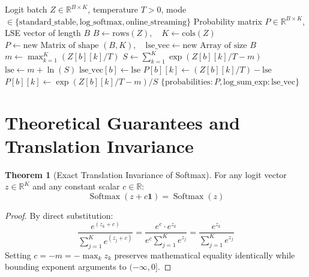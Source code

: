 \documentclass[11pt,a4paper]{article}
\theoremstyle{definition}
\newtheorem{theorem}{Theorem}[section]
\begin{document}
\begin{algorithm}[H]
\caption{Numerically Stable Softmax and Online Streaming Execution}
\begin{algorithmic}[1]
\Require Logit batch $Z \in \mathbb{R}^{B \times K}$, temperature $T > 0$, mode $\in \{\text{standard\_stable}, \text{log\_softmax}, \text{online\_streaming}\}$
\Ensure Probability matrix $P \in \mathbb{R}^{B \times K}$, LSE vector of length $B$
\State $B \gets \text{rows}(Z), \quad K \gets \text{cols}(Z)$
\State $P \gets \text{new Matrix of shape } (B, K), \quad \text{lse\_vec} \gets \text{new Array of size } B$
    \State $m \gets \max_{k=1}^K (Z[b][k] / T)$
    \State $S \gets \sum_{k=1}^K \exp(Z[b][k] / T - m)$
    \State $\text{lse} \gets m + \ln(S)$
    \State $\text{lse\_vec}[b] \gets \text{lse}$
            \State $P[b][k] \gets (Z[b][k] / T) - \text{lse}$
        \Else
            \State $P[b][k] \gets \exp(Z[b][k] / T - m) / S$
        \EndIf
    \EndFor
\EndFor
\State \Return $\{\text{probabilities}: P, \text{log\_sum\_exp}: \text{lse\_vec}\}$
\end{algorithmic}
\end{algorithm}

\section{Theoretical Guarantees and Translation Invariance}

\begin{theorem}[Exact Translation Invariance of Softmax]
For any logit vector $z \in \mathbb{R}^K$ and any constant scalar $c \in \mathbb{R}$:
\begin{equation}
\operatorname{Softmax}(z + c \mathbf{1}) = \operatorname{Softmax}(z)
\end{equation}
\end{theorem}

\begin{proof}
By direct substitution:
\begin{equation}
\frac{e^{(z_k + c)}}{\sum_{j=1}^K e^{(z_j + c)}} = \frac{e^c \cdot e^{z_k}}{e^c \sum_{j=1}^K e^{z_j}} = \frac{e^{z_k}}{\sum_{j=1}^K e^{z_j}}
\end{equation}
Setting $c = -m = -\max_k z_k$ preserves mathematical equality identically while bounding exponent arguments to $(-\infty, 0]$.
\end{proof}
\end{document}
